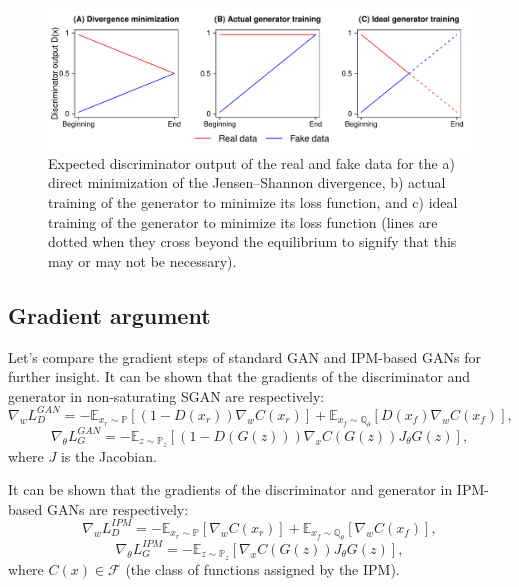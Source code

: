 \documentclass{article}
\begin{document}
\begin{figure}
	\centering
	\includegraphics[scale=0.5]{Figure1.pdf}
	\caption{Expected discriminator output of the real and fake data for the a) direct minimization of the Jensen–Shannon divergence, b) actual training of the generator to minimize its loss function, and c) ideal training of the generator to minimize its loss function (lines are dotted when they cross beyond the equilibrium to signify that this may or may not be necessary).}
\end{figure}

\subsection{Gradient argument}

Let's compare the gradient steps of standard GAN and IPM-based GANs for further insight. It can be shown that the gradients of the discriminator and generator in non-saturating SGAN are respectively:
\begin{equation}
	\nabla_{w}L_D^{GAN} = -\mathbb{E}_{x_r \sim \mathbb{P}}\left[ (1-D(x_r)) \nabla_{w} C(x_r) \right] + \mathbb{E}_{x_f \sim \mathbb{Q_\theta}} \left[ D(x_f) \nabla_{w} C(x_f) \right],
\end{equation}
\begin{equation}
\nabla_{\theta}L_G^{GAN} = -\mathbb{E}_{z \sim \mathbb{P}_z} \left[ (1-D(G(z))) \nabla_{x} C(G(z)) J_{\theta} G(z) \right],
\end{equation}
where $J$ is the Jacobian.

It can be shown that the gradients of the discriminator and generator in IPM-based GANs are respectively:
\begin{equation}
\nabla_{w}L_D^{IPM} = - \mathbb{E}_{x_r \sim \mathbb{P}} [\nabla_{w}C(x_r)] + \mathbb{E}_{x_f \sim \mathbb{Q_\theta}}[\nabla_{w}C(x_f)],
\end{equation}
\begin{equation}
\nabla_{\theta}L_G^{IPM} = - \mathbb{E}_{z \sim \mathbb{P}_z}[\nabla_{x} C(G(z)) J_{\theta} G(z)],
\end{equation}
where $C(x) \in \mathcal{F}$ (the class of functions assigned by the IPM).
\end{document}

